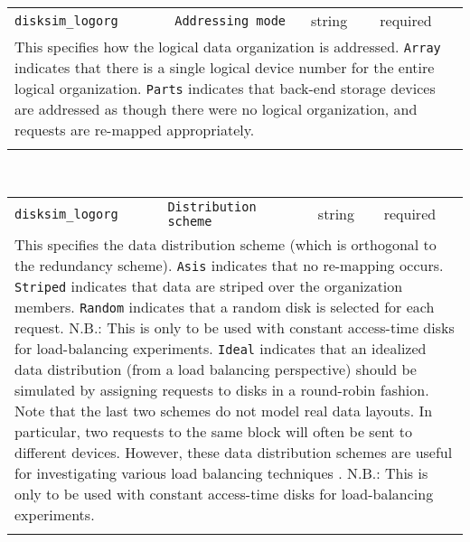 \noindent 
\begin{tabular}{|p{1.5in}|p{3.5in}|p{0.5in}|p{0.5in}|}
\cline{1-4}
\texttt{disksim\_logorg} & \texttt{Addressing mode} & string & required \\ 
\cline{1-4}
\multicolumn{4}{|p{6in}|}{
This specifies how the logical data organization is addressed.
\texttt{Array} indicates that there is a single logical device number for
the entire logical organization.
\texttt{Parts} indicates that back-end storage devices are addressed as
though there were no logical organization, and requests are re-mapped
appropriately.
}\\ 
\cline{1-4}
\multicolumn{4}{p{5in}}{}\\
\end{tabular}\\ 
\noindent 
\begin{tabular}{|p{1.5in}|p{3.5in}|p{0.5in}|p{0.5in}|}
\cline{1-4}
\texttt{disksim\_logorg} & \texttt{Distribution scheme} & string & required \\ 
\cline{1-4}
\multicolumn{4}{|p{6in}|}{
This specifies the data distribution scheme (which is orthogonal to
the redundancy scheme).
\texttt{Asis} indicates that no re-mapping occurs.
\texttt{Striped} indicates that data are striped over the organization
members.
\texttt{Random} indicates that a random disk is selected for each request.
N.B.: This is only to be used with constant access-time disks
for load-balancing experiments.
\texttt{Ideal} indicates that an idealized data distribution (from a load
balancing perspective) should be simulated by assigning requests to
disks in a round-robin fashion. Note that the last two schemes do not
model real data layouts. In particular, two requests to the same
block will often be sent to different devices. However, these data
distribution schemes are useful for investigating various load
balancing techniques \cite{Ganger93a}.
N.B.: This is only to be used with constant access-time disks
for load-balancing experiments.
}\\ 
\cline{1-4}
\multicolumn{4}{p{5in}}{}\\
\end{tabular}\\ 
\noindent 
